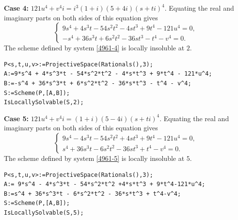 \documentclass[a4paper,12pt,english,reqno]{amsart}
\begin{document}
{\bf Case 4:} $121u^4+v^4i=i^3(1+i)(5+ 4i)(s+ti)^4$.  Equating the real and imaginary parts on both sides of this equation gives
\begin{equation}\label{4961-4}
\begin{cases}
9s^4 + 4s^3t - 54s^2t^2 - 4st^3 + 9t^4 - 121u^4=0, \\
-s^4 + 36s^3t + 6s^2t^2 - 36st^3 - t^4 - v^4=0.
\end{cases}
\end{equation}
The scheme defined by system \eqref{4961-4} is locally insoluble at $2$.

\begin{lstlisting}
P<s,t,u,v>:=ProjectiveSpace(Rationals(),3);
A:=9*s^4 + 4*s^3*t - 54*s^2*t^2 - 4*s*t^3 + 9*t^4 - 121*u^4;
B:=-s^4 + 36*s^3*t + 6*s^2*t^2 - 36*s*t^3 - t^4 - v^4;
S:=Scheme(P,[A,B]);
IsLocallySolvable(S,2);
\end{lstlisting}

{\bf Case 5:} $121u^4+v^4i=(1+i)(5- 4i)(s+ti)^4$.  Equating the real and imaginary parts on both sides of this equation gives
\begin{equation}\label{4961-5}
\begin{cases}
9s^4 - 4s^3t - 54s^2t^2 + 4st^3 + 9t^4 - 121u^4=0,\\
s^4 + 36s^3t - 6s^2t^2 - 36st^3 + t^4 - v^4=0.
\end{cases}
\end{equation}
The scheme defined by system \eqref{4961-5} is locally insoluble at $5$.

\begin{lstlisting}
P<s,t,u,v>:=ProjectiveSpace(Rationals(),3);
A:= 9*s^4 - 4*s^3*t - 54*s^2*t^2 +4*s*t^3 + 9*t^4-121*u^4;
B:=s^4 + 36*s^3*t - 6*s^2*t^2 - 36*s*t^3 + t^4-v^4;
S:=Scheme(P,[A,B]);
IsLocallySolvable(S,5);
\end{lstlisting}
\end{document}
